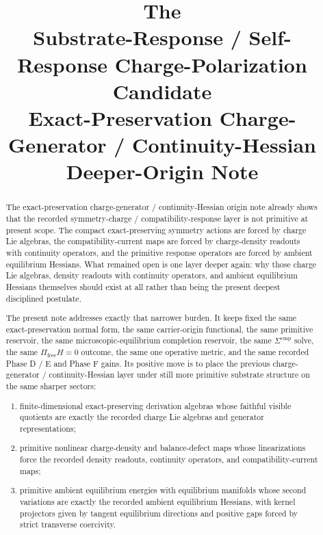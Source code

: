 \documentclass[11pt]{article}
\title{\textbf{The \TheoryName{}}\\[0.4em]
\large Substrate-Response / Self-Response Charge-Polarization Candidate\\
\large Exact-Preservation Charge-Generator / Continuity-Hessian\\
\large Deeper-Origin Note}
\author{}
\date{}
\begin{document}
\maketitle

\begin{abstract}
The exact-preservation charge-generator / continuity-Hessian origin note already shows that the recorded symmetry-charge / compatibility-response layer is not primitive at present scope. The compact exact-preserving symmetry actions are forced by charge Lie algebras, the compatibility-current maps are forced by charge-density readouts with continuity operators, and the primitive response operators are forced by ambient equilibrium Hessians. What remained open is one layer deeper again: why those charge Lie algebras, density readouts with continuity operators, and ambient equilibrium Hessians themselves should exist at all rather than being the present deepest disciplined postulate.

The present note addresses exactly that narrower burden. It keeps fixed the same exact-preservation normal form, the same carrier-origin functional, the same primitive reservoir, the same microscopic-equilibrium completion reservoir, the same \(\Sigma^{\mathrm{cmp}}\) solve, the same \(\Pi_{\mathrm{free}}H=0\) outcome, the same one operative metric, and the same recorded Phase D / E and Phase F gains. Its positive move is to place the previous charge-generator / continuity-Hessian layer under still more primitive substrate structure on the same sharper sectors:
\begin{enumerate}
    \item finite-dimensional exact-preserving derivation algebras whose faithful visible quotients are exactly the recorded charge Lie algebras and generator representations;
    \item primitive nonlinear charge-density and balance-defect maps whose linearizations force the recorded density readouts, continuity operators, and compatibility-current maps;
    \item primitive ambient equilibrium energies with equilibrium manifolds whose second variations are exactly the recorded ambient equilibrium Hessians, with kernel projectors given by tangent equilibrium directions and positive gaps forced by strict transverse coercivity.
\end{enumerate}


\end{abstract}
\end{document}
